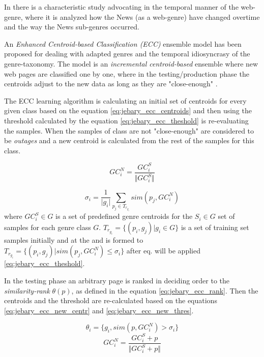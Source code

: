 In \parencite{caple2017genre} there is a characteristic study advocating in the temporal manner of the web-genre, where it is analyzed how the News (as a web-genre) have changed overtime and the way the News sub-genres occurred.

An \textit{Enhanced Centroid-based Classification (ECC)} ensemble model has been proposed for dealing with adapted genres and the temporal idiosyncrasy of the genre-taxonomy. The model is an \textit{incremental centroid-based} ensemble where new web pages are classified one by one, where in the testing/production phase the centroids adjust to the new data as long as they are "close-enough" \parencite{jebari2015combination}.

The ECC learning algorithm is calculating an initial set of centroids for every given class based on the equation \ref{eq:jebary_ecc_centroids} and then using the threshold calculated by the equation \ref{eq:jebary_ecc_theshold} is re-evaluating the samples. When the samples of  class are not "close-enough" are considered to be \textit{outages} and a new centroid is calculated from the rest of the samples for this class. 

\begin{equation}\label{eq:jebary_ecc_centroids}
	GC_{i}^{N} = \frac{GC^{S}_{i}}{\Vert GC^{S}_{i}\Vert }
\end{equation}

\begin{equation}\label{eq:jebary_ecc_theshold}
	\sigma_{i} = \frac{1}{\vert g_{i} \vert } \sum_{p_{j} \in T_{r_{g_{i}}}} sim(p_{j}, GC_{i}^{N})
\end{equation}
\noindent
where $GC^{S}_{i} \in G$ is a set of predefined genre centroids for the $S_{i} \in G$ set of samples for each genre class $G$. $T_{r_{g_{i}}} =   \{ (p_{i}, g_{j}) \vert g_{i} \in G  \}$ is a set of training set samples initially and at the and is formed to $T_{r_{g_{i}}} =   \{ (p_{i}, g_{j}) \vert sim(p_{j}, GC^{N}_{i}) \leq \sigma_{i} \}$  after eq. will be applied \ref{eq:jebary_ecc_theshold}.

In the testing phase an arbitrary page is ranked in deciding order to the \textit{similarity-rank} $\theta(p)$, as defined in the equation \ref{eq:jebary_ecc_rank}. Then the centroids and the threshold are re-calculated based on the equations \ref{eq:jebary_ecc_new_centr} and \ref{eq:jebary_ecc_new_thres}. 

\begin{equation}\label{eq:jebary_ecc_rank}
	\theta_{i} = \{g_{i}, sim(p, GC_{i}^{N}) > \sigma_{i}\}
\end{equation}
\begin{equation}\label{eq:jebary_ecc_new_centr}
	GC_{i}^{N} =  \frac{GC^{S}_{i} + p}{\Vert GC^{S}_{i}  + p\Vert}
\end{equation}

